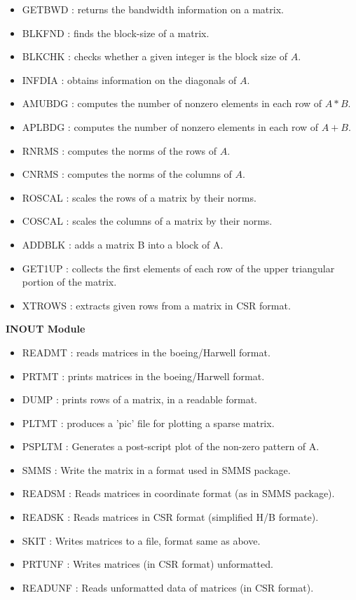 \begin{itemize}
\item GETBWD : returns the bandwidth information on a matrix.              
\item BLKFND : finds the block-size of a matrix.        
\item BLKCHK : checks whether a given integer is the block size of $A$.
\item INFDIA : obtains information on the diagonals of $A$.    
\item AMUBDG : computes the number of nonzero elements in each 
	row of $A*B$.
\item APLBDG : computes the number of nonzero elements in each 
	row of $ A+B$. 
\item RNRMS  : computes the norms of the rows of $A$.                
\item CNRMS  : computes the norms of the columns of $A$.                      
\item ROSCAL : scales the rows of a matrix by their norms.                 
\item COSCAL : scales the columns of a matrix by their norms.              
\item ADDBLK : adds a matrix B into a block of A. 
\item GET1UP : collects the first elements of each row of the upper
               triangular portion of the matrix.
\item XTROWS : extracts given rows from a matrix in CSR format.

\end{itemize}

\vskip 0.3in
\centerline{\bf INOUT Module} 

\begin{itemize} 

\item  READMT : reads matrices in the boeing/Harwell format.               
\item  PRTMT  : prints matrices in the boeing/Harwell format.   
\item  DUMP   : prints rows of a matrix,  in a readable format.
\item  PLTMT  : produces a 'pic' file for plotting a sparse matrix.
\item PSPLTM  : Generates a post-script plot of the non-zero 
pattern of A.
\item SMMS    : Write the matrix in a format used in SMMS package.
\item READSM  : Reads matrices in coordinate format (as in SMMS 
package).
\item READSK  : Reads matrices in CSR format (simplified H/B formate).
\item SKIT    : Writes matrices to a file, format same as above.
\item PRTUNF  : Writes matrices (in CSR format) unformatted.
\item READUNF : Reads unformatted data of matrices (in CSR format).
\end{itemize}

